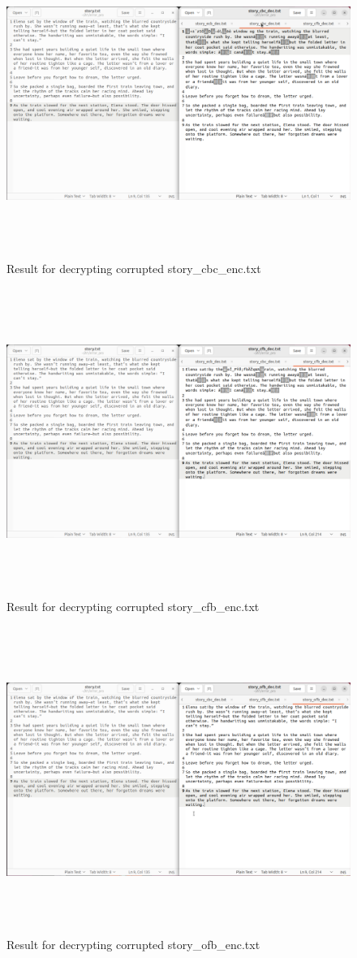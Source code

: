 \documentclass{article}
\begin{document}
\begin{figure}[h]
    \centering
    \includegraphics[height=10cm]{images/text_comp_cbc.png}
    \caption{Result for decrypting corrupted story\_cbc\_enc.txt}
\end{figure}
\begin{figure}[h]
    \centering
    \includegraphics[height=10cm]{images/text_comp_cfb.png}
    \caption{Result for decrypting corrupted story\_cfb\_enc.txt}
\end{figure}
\begin{figure}[h]
    \centering
    \includegraphics[height=10cm]{images/text_comp_ofb.png}
    \caption{Result for decrypting corrupted story\_ofb\_enc.txt}
\end{figure}
\end{document}

